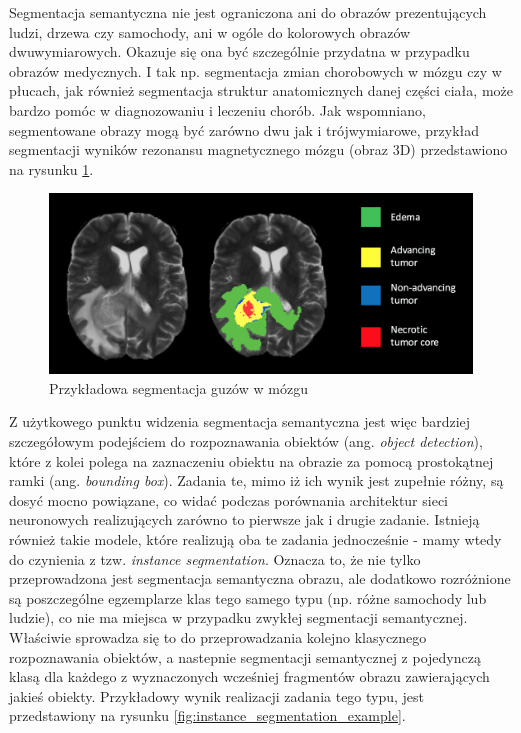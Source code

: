 \documentclass{classrep}
\begin{document}
{        %
        Segmentacja semantyczna nie jest ograniczona ani do obrazów prezentujących ludzi, drzewa czy
        samochody, ani w ogóle do kolorowych obrazów dwuwymiarowych. Okazuje się ona być szczególnie
        przydatna w przypadku obrazów medycznych. I tak np. segmentacja zmian chorobowych w mózgu czy w
        płucach, jak również segmentacja struktur anatomicznych danej części ciała, może bardzo pomóc w
        diagnozowaniu i leczeniu chorób. Jak wspomniano, segmentowane obrazy mogą być zarówno dwu jak i
        trójwymiarowe, przykład segmentacji wyników rezonansu magnetycznego mózgu (obraz 3D) przedstawiono
        na rysunku \ref{fig:medical_semantic_segmentation_example}.

        \begin{figure}[!htbp]
            \centering
            \includegraphics[width=\textwidth]{img/medical_semantic_segmentation_example.png}
            \caption{Przykładowa segmentacja guzów w mózgu \cite{url:medical_semantic_segmentation_example}}
            \label{fig:medical_semantic_segmentation_example}
        \end{figure}
        \FloatBarrier

        Z użytkowego punktu widzenia segmentacja semantyczna jest więc bardziej szczegółowym podejściem do
        rozpoznawania obiektów (ang. \emph{object detection}), które z kolei polega na zaznaczeniu obiektu
        na obrazie za pomocą prostokątnej ramki (ang. \emph{bounding box}). Zadania te, mimo iż ich wynik
        jest zupełnie różny, są dosyć mocno powiązane, co widać podczas porównania architektur sieci
        neuronowych realizujących zarówno to pierwsze jak i drugie zadanie. Istnieją również takie modele,
        które realizują oba te zadania jednocześnie - mamy wtedy do czynienia z tzw. \emph{instance
        segmentation}. Oznacza to, że nie tylko przeprowadzona jest segmentacja semantyczna obrazu, ale
        dodatkowo rozróżnione są poszczególne egzemplarze klas tego samego typu (np. różne samochody lub
        ludzie), co nie ma miejsca w przypadku zwykłej segmentacji semantycznej. Właściwie sprowadza się to
        do przeprowadzania kolejno klasycznego rozpoznawania obiektów, a nastepnie segmentacji semantycznej
        z pojedynczą klasą dla każdego z wyznaczonych wcześniej fragmentów obrazu zawierających jakieś
        obiekty. Przykładowy wynik realizacji zadania tego typu, jest przedstawiony na rysunku
        \ref{fig:instance_segmentation_example}.

}
\end{document}
